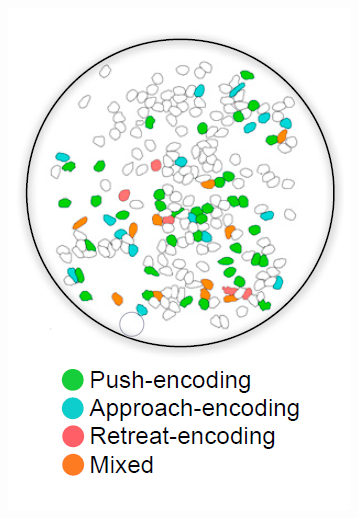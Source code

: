 \documentclass[12pt, a4paper]{report}
\begin{document}
\begin{figure}[H]
	\begin{minipage}{\linewidth}
		\centering
		\begin{minipage}{0.35\linewidth}
			\begin{figure}[H]
				\includegraphics[width=\linewidth]{kingsbury2.png}
				

\end{figure}
\end{minipage}
\end{minipage}
\end{figure}
\end{document}
